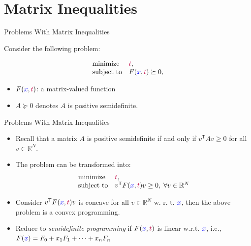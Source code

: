 \documentclass[10pt,ignorenonframetext,serif,onlymath]{beamer}
\providecommand{\tightlist}{%
  \setlength{\itemsep}{0pt}\setlength{\parskip}{0pt}}
\begin{document}
\hypertarget{matrix-inequalities}{%
\section{Matrix Inequalities}\label{matrix-inequalities}}

\begin{frame}{Problems With Matrix Inequalities}
\protect\hypertarget{problems-with-matrix-inequalities}{}

Consider the following problem:

\[\begin{array}{ll}
    \text{minimize}    & {\color{purple}t}, \\
    \text{subject to}  & F({\color{blue}x}, {\color{purple}t}) \succeq 0,
\end{array}\]

\begin{itemize}
\tightlist
\item
  \(F({\color{blue}x}, {\color{purple}t})\): a matrix-valued function
\item
  \(A \succeq 0\) denotes \(A\) is positive semidefinite.
\end{itemize}

\end{frame}

\begin{frame}{Problems With Matrix Inequalities}
\protect\hypertarget{problems-with-matrix-inequalities-1}{}

\begin{itemize}
\tightlist
\item
  Recall that a matrix \(A\) is positive semidefinite if and only if
  \(v^\mathsf{T} A v \ge 0\) for all \(v \in \mathbb{R}^N\).
\item
  The problem can be transformed into: \[\begin{array}{ll}
            \text{minimize}      & {\color{purple}t}, \\
            \text{subject to}    & v^\mathsf{T} F({\color{blue}x}, {\color{purple}t}) v \ge 0, \; \forall v \in \mathbb{R}^N
    \end{array}\]
\item
  Consider \(v^\mathsf{T} F({\color{blue}x}, {\color{purple}t}) v\) is concave
  for all \(v \in \mathbb{R}^N\) w. r. t. \({\color{blue}x}\), then the
  above problem is a convex programming.
\item
  Reduce to \emph{semidefinite programming} if
  \(F({\color{blue}x}, {\color{purple}t})\) is linear w.r.t.
  \({\color{blue}x}\), i.e.,
  \(F({\color{blue}x}) = F_0 + x_1 F_1 + \cdots + x_n F_n\)
\end{itemize}

\end{frame}
\end{document}
